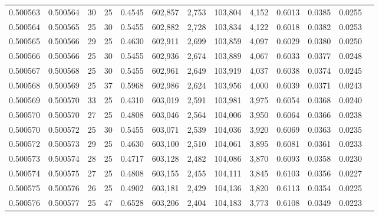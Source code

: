 \begin{tabular}{rrrrrrrrrrrrr}
0.500563 & 0.500564 &    30 &  25 &                                     0.4545 & 602,857 &   2,753 & 103,804 &   4,152 & 0.6013 & 0.0385 & 0.0255 \\
0.500564 & 0.500565 &    25 &  30 &                                     0.5455 & 602,882 &   2,728 & 103,834 &   4,122 & 0.6018 & 0.0382 & 0.0253 \\
0.500565 & 0.500566 &    29 &  25 &                                     0.4630 & 602,911 &   2,699 & 103,859 &   4,097 & 0.6029 & 0.0380 & 0.0250 \\
0.500566 & 0.500566 &    25 &  30 &                                     0.5455 & 602,936 &   2,674 & 103,889 &   4,067 & 0.6033 & 0.0377 & 0.0248 \\
0.500567 & 0.500568 &    25 &  30 &                                     0.5455 & 602,961 &   2,649 & 103,919 &   4,037 & 0.6038 & 0.0374 & 0.0245 \\
0.500568 & 0.500569 &    25 &  37 &                                     0.5968 & 602,986 &   2,624 & 103,956 &   4,000 & 0.6039 & 0.0371 & 0.0243 \\
0.500569 & 0.500570 &    33 &  25 &                                     0.4310 & 603,019 &   2,591 & 103,981 &   3,975 & 0.6054 & 0.0368 & 0.0240 \\
0.500570 & 0.500570 &    27 &  25 &                                     0.4808 & 603,046 &   2,564 & 104,006 &   3,950 & 0.6064 & 0.0366 & 0.0238 \\
0.500570 & 0.500572 &    25 &  30 &                                     0.5455 & 603,071 &   2,539 & 104,036 &   3,920 & 0.6069 & 0.0363 & 0.0235 \\
0.500572 & 0.500573 &    29 &  25 &                                     0.4630 & 603,100 &   2,510 & 104,061 &   3,895 & 0.6081 & 0.0361 & 0.0233 \\
0.500573 & 0.500574 &    28 &  25 &                                     0.4717 & 603,128 &   2,482 & 104,086 &   3,870 & 0.6093 & 0.0358 & 0.0230 \\
0.500574 & 0.500575 &    27 &  25 &                                     0.4808 & 603,155 &   2,455 & 104,111 &   3,845 & 0.6103 & 0.0356 & 0.0227 \\
0.500575 & 0.500576 &    26 &  25 &                                     0.4902 & 603,181 &   2,429 & 104,136 &   3,820 & 0.6113 & 0.0354 & 0.0225 \\
0.500576 & 0.500577 &    25 &  47 &                                     0.6528 & 603,206 &   2,404 & 104,183 &   3,773 & 0.6108 & 0.0349 & 0.0223 \\

\end{tabular}
